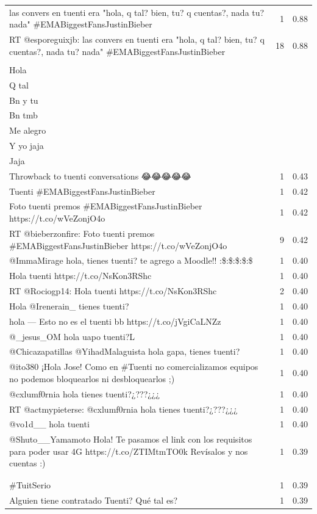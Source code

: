 \begin{longtable}{p{12.5cm}rr}
\bottomrule
\endlastfoot
las convers en tuenti era "hola, q tal? bien, tu? q cuentas?, nada tu? nada" \#EMABiggestFansJustinBieber & 1 & 0.88 \\
RT @esporeguixjb: las convers en tuenti era "hola, q tal? bien, tu? q cuentas?, nada tu? nada" \#EMABiggestFansJustinBieber & 18 & 0.88 \\
\begin{tabular}[c]{@{}l@{}}Hola  \\ Hola \\ Q tal \\ Bn y tu \\ Bn tmb \\ Me alegro \\ Y yo jaja \\ Jaja \\ Throwback to tuenti conversations 😂😂😂😂😂\end{tabular} & 1 & 0.43 \\
Tuenti \#EMABiggestFansJustinBieber & 1 & 0.42 \\
Foto tuenti premos \#EMABiggestFansJustinBieber https://t.co/wVeZonjO4o & 1 & 0.42 \\
RT @bieberzonfire: Foto tuenti premos \#EMABiggestFansJustinBieber https://t.co/wVeZonjO4o & 9 & 0.42 \\
@ImmaMirage hola, tienes tuenti? te agrego a Moodle!! :\$:\$:\$:\$:\$ & 1 & 0.40 \\
Hola tuenti https://t.co/NsKon3RShc & 1 & 0.40 \\
RT @Rociogp14: Hola tuenti https://t.co/NsKon3RShc & 2 & 0.40 \\
Hola @Irenerain\_ tienes tuenti? & 1 & 0.40 \\
hola — Esto no es el tuenti bb https://t.co/jVgiCaLNZz & 1 & 0.40 \\
@\_jesus\_OM hola uapo tuenti?L & 1 & 0.40 \\
@Chicazapatillas @YihadMalaguista hola gapa, tienes tuenti? & 1 & 0.40 \\
@ito380 ¡Hola Jose! Como en \#Tuenti no comercializamos equipos no podemos bloquearlos ni desbloquearlos ;) & 1 & 0.40 \\
@cxlumf0rnia hola tienes tuenti?¿???¿¿¿ & 1 & 0.40 \\
RT @actmypieterse: @cxlumf0rnia hola tienes tuenti?¿???¿¿¿ & 1 & 0.40 \\
@vo1d\_\_ hola tuenti & 1 & 0.40 \\
@Shuto\_\_Yamamoto Hola! Te pasamos el link con los requisitos para poder usar 4G https://t.co/ZTIMtmTO0k Revísalos y nos cuentas :) & 1 & 0.39 \\
\begin{tabular}[c]{@{}l@{}}Que tal es tuenti??? \\  \\ \#TuitSerio\end{tabular} & 1 & 0.39 \\
Alguien tiene contratado Tuenti? Qué tal es? & 1 & 0.39 \\

\end{longtable}
\clearpage

